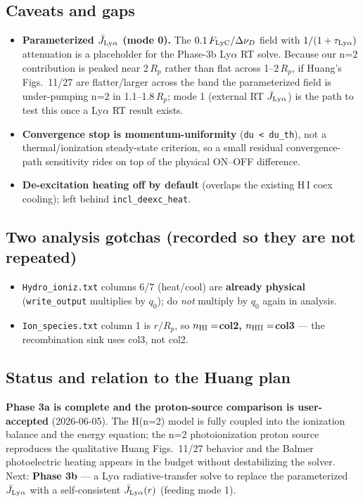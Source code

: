 \documentclass[english,a4paper]{kiseon_memo}
\begin{document}
\subsection{Caveats and gaps}
\begin{itemize}
  \item \textbf{Parameterized \(\bar J_{{\rm Ly}\alpha}\) (mode 0).} The
    \(0.1\,F_{\rm LyC}/\Delta\nu_D\) field with \(1/(1+\tau_{{\rm Ly}\alpha})\)
    attenuation is a placeholder for the Phase-3b Ly\(\alpha\) RT solve. Because our
    n=2 contribution is peaked near 2\,\(R_p\) rather than flat across
    1--2\,\(R_p\), if Huang's Figs.~11/27 are flatter/larger across the band the
    parameterized field is under-pumping n=2 in 1.1--1.8\,\(R_p\); mode 1 (external
    RT \(\bar J_{{\rm Ly}\alpha}\)) is the path to test this once a Ly\(\alpha\) RT
    result exists.
  \item \textbf{Convergence stop is momentum-uniformity} (\verb|du < du_th|), not a
    thermal/ionization steady-state criterion, so a small residual convergence-path
    sensitivity rides on top of the physical ON--OFF difference.
  \item \textbf{De-excitation heating off by default} (overlaps the existing H\,I
    coex cooling); left behind \verb|incl_deexc_heat|.
\end{itemize}

\subsection{Two analysis gotchas (recorded so they are not repeated)}
\begin{itemize}
  \item \texttt{Hydro\_ioniz.txt} columns 6/7 (heat/cool) are \textbf{already
    physical} (\verb|write_output| multiplies by \(q_0\)); do \emph{not} multiply
    by \(q_0\) again in analysis.
  \item \texttt{Ion\_species.txt} column 1 is \(r/R_p\), so
    \textbf{\(n_{\rm HI}=\)col2, \(n_{\rm HII}=\)col3} --- the recombination sink
    uses col3, not col2.
\end{itemize}

\subsection{Status and relation to the Huang plan}

\textbf{Phase 3a is complete and the proton-source comparison is user-accepted}
(2026-06-05). The H(n=2) model is fully coupled into the ionization balance and the
energy equation; the n=2 photoionization proton source reproduces the qualitative
Huang Figs.~11/27 behavior and the Balmer photoelectric heating appears in the
budget without destabilizing the solver. Next: \textbf{Phase 3b} --- a
Ly\(\alpha\) radiative-transfer solve to replace the parameterized
\(\bar J_{{\rm Ly}\alpha}\) with a self-consistent \(\bar J_{{\rm Ly}\alpha}(r)\)
(feeding mode 1).
\end{document}
